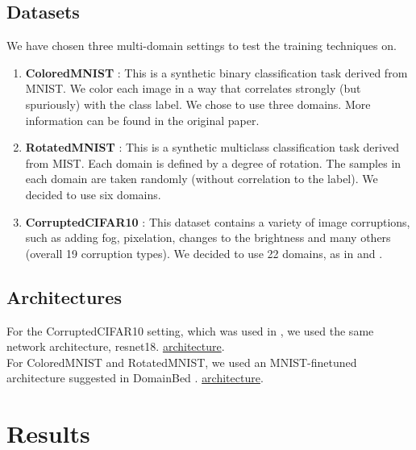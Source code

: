 \documentclass[12pt,a4paper]{article}
\begin{document}
	\subsection{Datasets}
	\label{ssec:datasets}
	We have chosen three multi-domain settings to test the training techniques on.
	\begin{enumerate}
		\item \textbf{ColoredMNIST} \cite{arjovsky2019invariant}: This is a synthetic binary classification task derived from MNIST. We color each image in a way
		that correlates strongly (but spuriously) with the class label. We chose to use three domains. More information can be found in the original paper.
		
		\item \textbf{RotatedMNIST} \cite{ghifary2015domain}: This is a synthetic multiclass classification task derived from MIST. Each domain is defined by a degree of rotation. The samples in each domain are taken randomly (without correlation to the label). We decided to use six domains.
		
		\item \textbf{CorruptedCIFAR10} \cite{hendrycks2019benchmarking}: This dataset contains a variety of image corruptions, such as adding fog, pixelation, changes to the brightness and many others (overall 19 corruption types). We decided to use 22 domains, as in \cite{bohdal2021meta} and \cite{zhang2021adaptive}.
	\end{enumerate}

	\subsection{Architectures}
	For the CorruptedCIFAR10 setting, which was used in \cite{bohdal2021meta}, we used the same network architecture, resnet18. \href{https://github.com/Rotem-BZ/MultiDomainMetaCalibration/blob/fc71ab125edd145c33be022b21befdbcb0ff273f/MetaCalibraion/Net/resnet.py#L122}{architecture}. \\
	For ColoredMNIST and RotatedMNIST, we used an MNIST-finetuned architecture suggested in DomainBed \citep{gulrajani2020search}. \href{https://github.com/Rotem-BZ/MultiDomainMetaCalibration/blob/56927ba8ecc2a9ef6c5a6fbbdfd81dcb45bf8884/networks.py#L118}{architecture}.
	
\section{Results}
\end{document}
